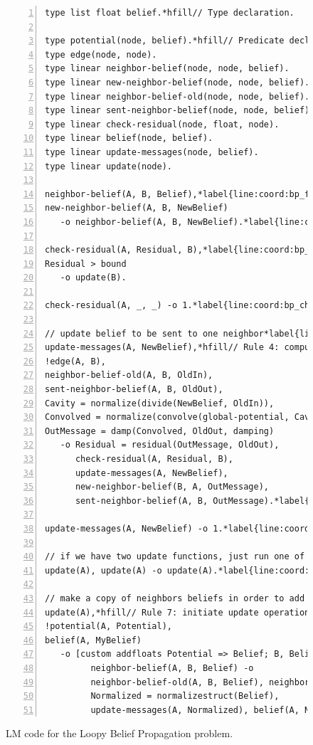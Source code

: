 \begin{figure}[ht]
\begin{Verbatim}[numbers=left, fontsize=\codesize, commandchars=\*\{\}]
type list float belief.*hfill// Type declaration.

type potential(node, belief).*hfill// Predicate declaration.
type edge(node, node).
type linear neighbor-belief(node, node, belief).
type linear new-neighbor-belief(node, node, belief).
type linear neighbor-belief-old(node, node, belief).
type linear sent-neighbor-belief(node, node, belief).
type linear check-residual(node, float, node).
type linear belief(node, belief).
type linear update-messages(node, belief).
type linear update(node).

neighbor-belief(A, B, Belief),*label{line:coord:bp_first1}*hfill// Rule 1: update neighbor belief value.
new-neighbor-belief(A, B, NewBelief)
   -o neighbor-belief(A, B, NewBelief).*label{line:coord:bp_first2}

check-residual(A, Residual, B),*label{line:coord:bp_check1}*hfill// Rule 2: check residual.
Residual > bound
   -o update(B).

check-residual(A, _, _) -o 1.*label{line:coord:bp_check2}*hfill// Rule 3: check residual.

// update belief to be sent to one neighbor*label{line:coord:bp_iterate1}
update-messages(A, NewBelief),*hfill// Rule 4: compute belief to be sent to a neighbor node.
!edge(A, B),
neighbor-belief-old(A, B, OldIn),
sent-neighbor-belief(A, B, OldOut),
Cavity = normalize(divide(NewBelief, OldIn)),
Convolved = normalize(convolve(global-potential, Cavity)),
OutMessage = damp(Convolved, OldOut, damping)
   -o Residual = residual(OutMessage, OldOut),
      check-residual(A, Residual, B),
      update-messages(A, NewBelief),
      new-neighbor-belief(B, A, OutMessage),
      sent-neighbor-belief(A, B, OutMessage).*label{line:coord:bp_iterate2}

update-messages(A, NewBelief) -o 1.*label{line:coord:bp_iterate_final}*hfill// Rule 5: all neighbors were processed.

// if we have two update functions, just run one of them*label{line:coord:bp_last1}
update(A), update(A) -o update(A).*label{line:coord:bp_update}*hfill// Rule 6: prune update operations.

// make a copy of neighbors beliefs in order to add them up*label{line:coord:bp_update1}
update(A),*hfill// Rule 7: initiate update operation.
!potential(A, Potential),
belief(A, MyBelief)
   -o [custom addfloats Potential => Belief; B, Belief |*label{line:coord:bp_agg1}
         neighbor-belief(A, B, Belief) -o
         neighbor-belief-old(A, B, Belief), neighbor-belief(A, B, Belief) ->
         Normalized = normalizestruct(Belief),
         update-messages(A, Normalized), belief(A, Normalized)].*label{line:coord:bp_last2}*label{line:coord:bp_update2}*label{line:coord:bp_agg2}
\end{Verbatim}
\caption{LM code for the Loopy Belief Propagation problem.}
\label{code:coordination:bp}
\end{figure}

